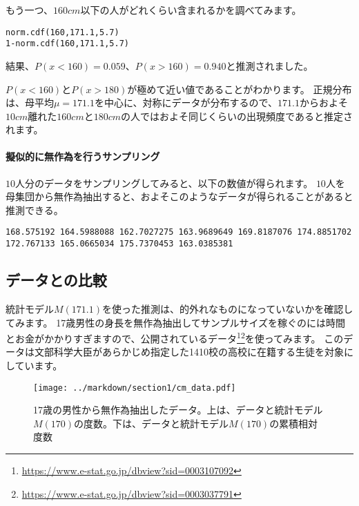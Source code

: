 \documentclass[a4paper,11pt,dvipdfmx]{jsarticle}
\begin{document}
もう一つ、$160cm$以下の人がどれくらい含まれるかを調べてみます。

\begin{lstlisting}
norm.cdf(160,171.1,5.7)
1-norm.cdf(160,171.1,5.7)
\end{lstlisting}
結果、$P(x<160)=0.059$、$P(x>160)=0.940$と推測されました。

$P(x<160)$と$P(x>180)$が極めて近い値であることがわかります。
正規分布は、母平均$\mu=171.1$を中心に、対称にデータが分布するので、$171.1$からおよそ$10cm$離れた$160cm$と$180cm$の人ではおよそ同じくらいの出現頻度であると推定されます。


    
\paragraph{擬似的に無作為を行うサンプリング}
$10$人分のデータをサンプリングしてみると、以下の数値が得られます。
$10$人を母集団から無作為抽出すると、およそこのようなデータが得られることがあると推測できる。

\begin{lstlisting}
168.575192 164.5988088 162.7027275 163.9689649 169.8187076 174.8851702 172.767133 165.0665034 175.7370453 163.0385381
\end{lstlisting}



\subsection{データとの比較}
統計モデル$M(171.1)$を使った推測は、的外れなものになっていないかを確認してみます。
17歳男性の身長を無作為抽出してサンプルサイズを稼ぐのには時間とお金がかかりすぎますので、公開されているデータ\footnote{ \url{https://www.e-stat.go.jp/dbview?sid=0003107092} }\footnote{\url{https://www.e-stat.go.jp/dbview?sid=0003037791}}を使ってみます。
このデータは文部科学大臣があらかじめ指定した1410校の高校に在籍する生徒を対象にしています。

\begin{figure}
\begin{center}
    \texttt{[image: ../markdown/section1/cm\_data.pdf]}
    \caption{17歳の男性から無作為抽出したデータ。上は、データと統計モデル$M(170)$の度数。下は、データと統計モデル$M(170)$の累積相対度数}
    \label{fig:real_height_men}
\end{center}
\end{figure}
\end{document}
